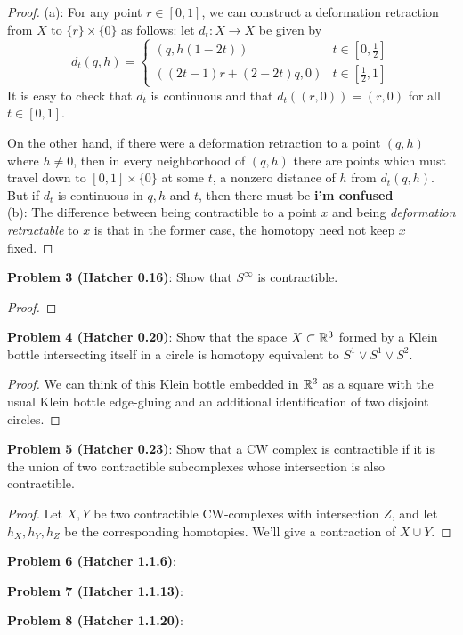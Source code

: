 \documentclass{amsart}
\begin{document}
\begin{proof}
	(a): For any point $r\in [0,1]$, we can construct a deformation retraction from $X$ to $\{r\}\times \{0\}$ as follows: let $d_t:X\to X$ be given by
	$$
	d_t(q,h) = \begin{cases}
		(q,h(1 - 2t)) & t\in [0,\tfrac12]\\
		((2t-1)r+(2-2t)q,0) & t\in [\tfrac12,1]
	\end{cases}
	$$
	It is easy to check that $d_t$ is continuous and that $d_t((r,0)) = (r,0)$ for all $t\in[0,1]$.
	
	On the other hand, if there were a deformation retraction to a point $(q,h)$ where $h\neq 0$, then in every neighborhood of $(q,h)$ there are points which must travel down to $[0,1]\times \{0\}$ at some $t$, a nonzero distance of $h$ from $d_t(q,h)$. But if $d_t$ is continuous in $q,h$ and $t$, then there must be \textbf{i'm confused}\\
	
	(b): The difference between being contractible to a point $x$ and being \textit{deformation retractable} to $x$ is that in the former case, the homotopy need not keep $x$ fixed. 
\end{proof}

\newpage 


\noindent \textbf{Problem 3 (Hatcher 0.16)}: Show that $S^{\infty}$ is contractible.

\begin{proof}
	
\end{proof}
\newpage 


\noindent \textbf{Problem 4 (Hatcher 0.20)}: Show that the space $X\subset \mathbb{R}^3$ formed by a Klein bottle intersecting itself in a circle is homotopy equivalent to $S^1\vee S^1 \vee S^2$.
\begin{proof}
	We can think of this Klein bottle embedded in $\mathbb{R}^3$ as a square with the usual Klein bottle edge-gluing and an additional identification of two disjoint circles.
\end{proof}
\newpage 


\noindent \textbf{Problem 5 (Hatcher 0.23)}: Show that a CW complex is contractible if it is the union of two contractible subcomplexes whose intersection is also contractible.

\begin{proof}
	Let $X,Y$ be two contractible CW-complexes with intersection $Z$, and let $h_X,h_Y,h_Z$ be the corresponding homotopies. We'll give a contraction of $X\cup Y$.
\end{proof}

\newpage 


\noindent \textbf{Problem 6 (Hatcher 1.1.6)}: 

\newpage 


\noindent \textbf{Problem 7 (Hatcher 1.1.13)}:

\newpage 


\noindent \textbf{Problem 8 (Hatcher 1.1.20)}:
\end{document}
